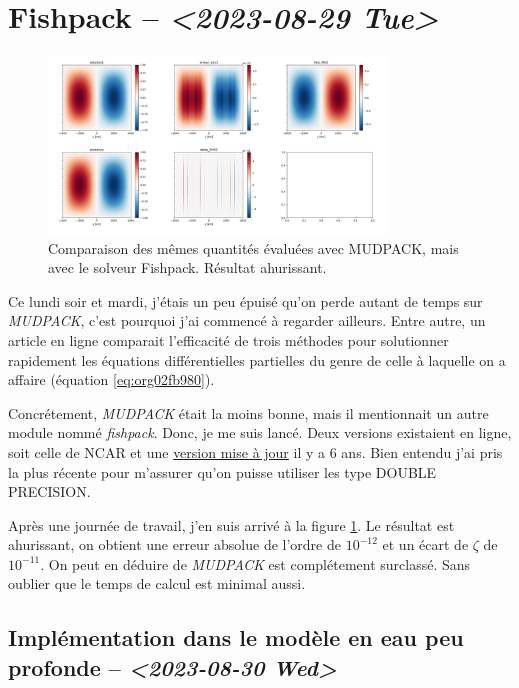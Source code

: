\documentclass[10pt]{article}
\numberwithin{equation}{section}
\begin{document}
\section{Fishpack -- \textit{<2023-08-29 Tue>}}
\label{sec:org811059c}

\begin{figure}[!htpb]
\centering
\includegraphics[width=0.8\textwidth]{figures/fishpack/2023-08-29-fishtest.png}
\caption{\label{fig:org536b02b}Comparaison des mêmes quantités évaluées avec MUDPACK, mais avec le solveur Fishpack. Résultat ahurissant.}
\end{figure}

Ce lundi soir et mardi, j'étais un peu épuisé qu'on perde autant de temps sur \emph{MUDPACK}, c'est pourquoi j'ai commencé à regarder ailleurs.
Entre autre, un article en ligne comparait l'efficacité de trois méthodes pour solutionner rapidement les équations différentielles partielles du genre de celle à laquelle on a affaire (équation \ref{eq:org02fb980}).\bigskip

Concrétement, \emph{MUDPACK} était la moins bonne, mais il mentionnait un autre module nommé \emph{fishpack}.
Donc, je me suis lancé.
Deux versions existaient en ligne, soit celle de NCAR et une \href{https://github.com/jlokimlin/fishpack}{version mise à jour} il y a 6 ans.
Bien entendu j'ai pris la plus récente pour m'assurer qu'on puisse utiliser les type DOUBLE PRECISION.\bigskip

Après une journée de travail, j'en suis arrivé à la figure \ref{fig:org536b02b}.
Le résultat est ahurissant, on obtient une erreur absolue de l'ordre de \(10^{-12}\) et un écart de \(\zeta\) de \(10^{-11}\).
On peut en déduire de \emph{MUDPACK} est complétement surclassé.
Sans oublier que le temps de calcul est minimal aussi.

\subsection{Implémentation dans le modèle en eau peu profonde -- \textit{<2023-08-30 Wed>}}
\label{sec:orgb9e8ff1}
\end{document}
